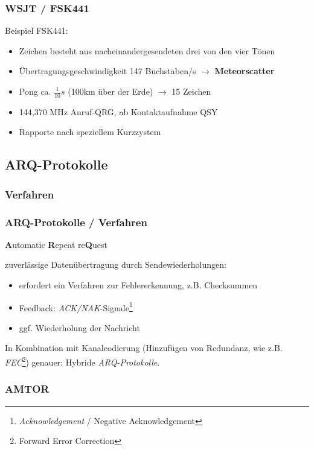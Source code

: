 \begin{frame}
  \frametitle{WSJT / FSK441}

  Beispiel FSK441:

  \begin{itemize}
    \item Zeichen besteht aus nacheinandergesendeten drei von den vier Tönen
    \item Übertragungsgeschwindigkeit 147 Buchstaben/s $\rightarrow$
      \textbf{Meteorscatter}
    \item Pong ca. $\frac{1}{10}s$ (100km über der Erde) $\rightarrow$ 15 Zeichen
    \item 144,370 MHz Anruf-QRG, ab Kontaktaufnahme QSY
    \item Rapporte nach speziellem Kurzzystem
  \end{itemize}

\end{frame}

\subsection{ARQ-Protokolle}

\subsubsection{Verfahren}

\begin{frame}
  \frametitle{ARQ-Protokolle / Verfahren}

  \textbf{A}utomatic \textbf{R}epeat re\textbf{Q}uest

  zuverlässige Datenübertragung durch Sendewiederholungen:

  \begin{itemize}
    \item erfordert ein Verfahren zur Fehlererkennung, z.B. Checksummen
    \item Feedback: \emph{ACK/NAK}-Signale\footnote{\emph{Acknowledgement} /
      {Negative Acknowledgement}}
    \item ggf. Wiederholung der Nachricht
  \end{itemize}

  In Kombination mit Kanalcodierung (Hinzufügen von Redundanz, wie z.B.
  \emph{FEC}\footnote{Forward Error Correction}) genauer: Hybride \emph{ARQ-Protokolle}.

\end{frame}

\subsubsection{AMTOR}

